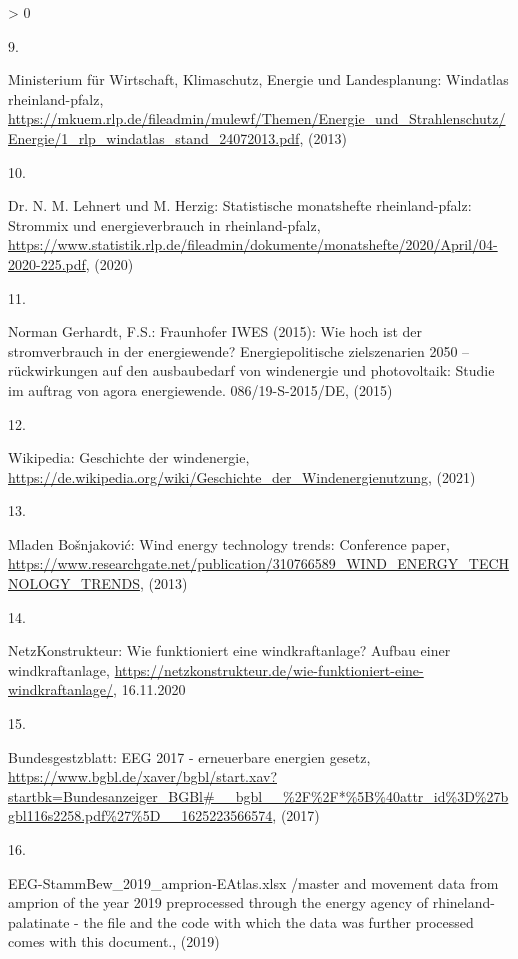 \documentclass[a4paper,11pt]{article}
\newlength{\cslhangindent}
\newlength{\csllabelwidth}
\newenvironment{CSLReferences}[3] %
 {%
  \setlength{\parindent}{0pt}
  \ifodd #1 \everypar{\setlength{\hangindent}{\cslhangindent}}\ignorespaces\fi
  \ifnum #2 > 0
  \setlength{\parskip}{#2\baselineskip}
  \fi
 }%
 {}
\newcommand{\CSLLeftMargin}[1]{\parbox[t]{\maxof{\widthof{#1}}{\csllabelwidth}}{#1}}
\newcommand{\CSLRightInline}[1]{\parbox[t]{\linewidth}{#1}}
\begin{document}
\begin{CSLReferences}{0}{0}
\leavevmode\hypertarget{ref-MinisteriumfurWirtschaftKlimaschutzEnergieundLandesplanung.2013}{}%
\CSLLeftMargin{9. }
\CSLRightInline{Ministerium für Wirtschaft, Klimaschutz, Energie und Landesplanung: Windatlas rheinland-pfalz, \url{https://mkuem.rlp.de/fileadmin/mulewf/Themen/Energie_und_Strahlenschutz/Energie/1_rlp_windatlas_stand_24072013.pdf}, (2013)}

\leavevmode\hypertarget{ref-Lehnert.2020}{}%
\CSLLeftMargin{10. }
\CSLRightInline{Dr. N. M. Lehnert und M. Herzig: Statistische monatshefte rheinland-pfalz: Strommix und energieverbrauch in rheinland-pfalz, \url{https://www.statistik.rlp.de/fileadmin/dokumente/monatshefte/2020/April/04-2020-225.pdf}, (2020)}

\leavevmode\hypertarget{ref-NormanGerhardt.2015}{}%
\CSLLeftMargin{11. }
\CSLRightInline{Norman Gerhardt, F.S.: Fraunhofer IWES (2015): Wie hoch ist der stromverbrauch in der energiewende? Energiepolitische zielszenarien 2050 -- r{ü}ckwirkungen auf den ausbaubedarf von windenergie und photovoltaik: Studie im auftrag von agora energiewende. 086/19-S-2015/DE, (2015)}

\leavevmode\hypertarget{ref-Wikipedia.2021}{}%
\CSLLeftMargin{12. }
\CSLRightInline{Wikipedia: Geschichte der windenergie, \url{https://de.wikipedia.org/wiki/Geschichte_der_Windenergienutzung}, (2021)}

\leavevmode\hypertarget{ref-MladenBosnjakovic.2013}{}%
\CSLLeftMargin{13. }
\CSLRightInline{Mladen Bošnjaković: Wind energy technology trends: Conference paper, \url{https://www.researchgate.net/publication/310766589_WIND_ENERGY_TECHNOLOGY_TRENDS}, (2013)}

\leavevmode\hypertarget{ref-NetzKonstrukteur.16.11.2020}{}%
\CSLLeftMargin{14. }
\CSLRightInline{NetzKonstrukteur: Wie funktioniert eine windkraftanlage? Aufbau einer windkraftanlage, \url{https://netzkonstrukteur.de/wie-funktioniert-eine-windkraftanlage/}, 16.11.2020}

\leavevmode\hypertarget{ref-Bundesgestzblatt.2017}{}%
\CSLLeftMargin{15. }
\CSLRightInline{Bundesgestzblatt: EEG 2017 - erneuerbare energien gesetz, \url{https://www.bgbl.de/xaver/bgbl/start.xav?startbk=Bundesanzeiger_BGBl\#__bgbl__\%2F\%2F*\%5B\%40attr_id\%3D\%27bgbl116s2258.pdf\%27\%5D__1625223566574}, (2017)}

\leavevmode\hypertarget{ref-EnergieagenturRheinlandPfalz.2019}{}%
\CSLLeftMargin{16. }
\CSLRightInline{EEG-StammBew{\_}2019{\_}amprion-EAtlas.xlsx /master and movement data from amprion of the year 2019 preprocessed through the energy agency of rhineland-palatinate - the file and the code with which the data was further processed comes with this document., (2019)}


\end{CSLReferences}
\end{document}
